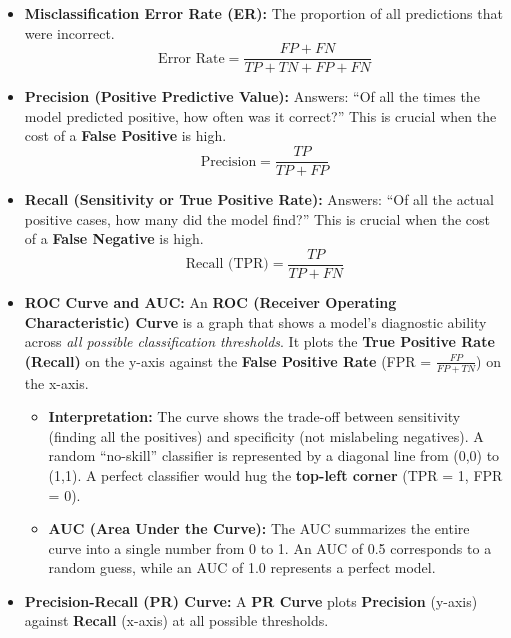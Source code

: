 \documentclass[
  letterpaper,
]{scrbook}
\providecommand{\tightlist}{%
  \setlength{\itemsep}{0pt}\setlength{\parskip}{0pt}}\usepackage{longtable,booktabs,array}
\begin{document}
\begin{itemize}
\item
  \textbf{Misclassification Error Rate (ER):} The proportion of all
  predictions that were incorrect. \[
    \text{Error Rate} = \frac{FP + FN}{TP + TN + FP + FN}
    \]
\item
  \textbf{Precision (Positive Predictive Value):} Answers: ``Of all the
  times the model predicted positive, how often was it correct?'' This
  is crucial when the cost of a \textbf{False Positive} is high. \[
    \text{Precision} = \frac{TP}{TP + FP}
    \]
\item
  \textbf{Recall (Sensitivity or True Positive Rate):} Answers: ``Of all
  the actual positive cases, how many did the model find?'' This is
  crucial when the cost of a \textbf{False Negative} is high. \[
    \text{Recall (TPR)} = \frac{TP}{TP + FN}
    \]
\item
  \textbf{ROC Curve and AUC:} An \textbf{ROC (Receiver Operating
  Characteristic) Curve} is a graph that shows a model's diagnostic
  ability across \emph{all possible classification thresholds}. It plots
  the \textbf{True Positive Rate (Recall)} on the y-axis against the
  \textbf{False Positive Rate} (FPR = \(\frac{FP}{FP + TN}\)) on the
  x-axis.

  \begin{itemize}
  \tightlist
  \item
    \textbf{Interpretation:} The curve shows the trade-off between
    sensitivity (finding all the positives) and specificity (not
    mislabeling negatives). A random ``no-skill'' classifier is
    represented by a diagonal line from (0,0) to (1,1). A perfect
    classifier would hug the \textbf{top-left corner} (TPR = 1, FPR =
    0).
  \item
    \textbf{AUC (Area Under the Curve):} The AUC summarizes the entire
    curve into a single number from 0 to 1. An AUC of 0.5 corresponds to
    a random guess, while an AUC of 1.0 represents a perfect model.
  \end{itemize}
\item
  \textbf{Precision-Recall (PR) Curve:} A \textbf{PR Curve} plots
  \textbf{Precision} (y-axis) against \textbf{Recall} (x-axis) at all
  possible thresholds.


\end{itemize}
\end{document}
